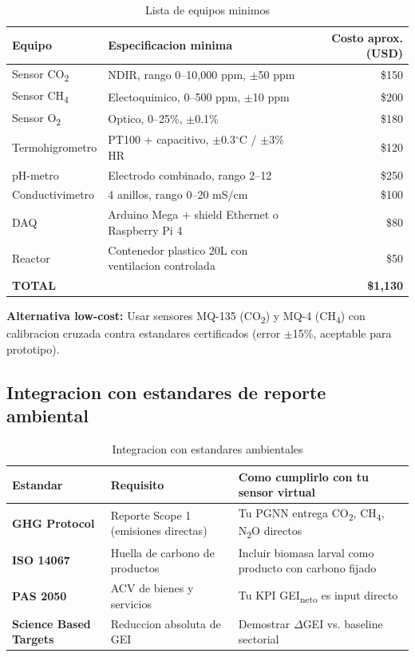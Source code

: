 \documentclass[12pt]{article}
\begin{document}
\begin{table}[H]
\centering
\caption{Lista de equipos minimos}
\label{tab:equipos_minimos}
\begin{tabular}{|l|l|r|}
\hline
\textbf{Equipo} & \textbf{Especificacion minima} & \textbf{Costo aprox. (USD)} \\ \hline
Sensor CO\textsubscript{2} & NDIR, rango 0--10,000 ppm, $\pm$50 ppm & \$150 \\ \hline
Sensor CH\textsubscript{4} & Electoquimico, 0--500 ppm, $\pm$10 ppm & \$200 \\ \hline
Sensor O\textsubscript{2} & Optico, 0--25\%, $\pm$0.1\% & \$180 \\ \hline
Termohigrometro & PT100 + capacitivo, $\pm$0.3$^\circ$C / $\pm$3\% HR & \$120 \\ \hline
pH-metro & Electrodo combinado, rango 2--12 & \$250 \\ \hline
Conductivimetro & 4 anillos, rango 0--20 mS/cm & \$100 \\ \hline
DAQ & Arduino Mega + shield Ethernet o Raspberry Pi 4 & \$80 \\ \hline
Reactor & Contenedor plastico 20L con ventilacion controlada & \$50 \\ \hline
\textbf{TOTAL} & & \textbf{\$1,130} \\ \hline
\end{tabular}
\end{table}

\noindent\textbf{Alternativa low-cost:} Usar sensores MQ-135 (CO\textsubscript{2}) y MQ-4 (CH\textsubscript{4}) con calibracion cruzada contra estandares certificados (error $\pm$15\%, aceptable para prototipo).

\subsection{Integracion con estandares de reporte ambiental}

\begin{table}[H]
\centering
\caption{Integracion con estandares ambientales}
\label{tab:estandares_ambientales}
\begin{tabular}{|l|l|l|}
\hline
\textbf{Estandar} & \textbf{Requisito} & \textbf{Como cumplirlo con tu sensor virtual} \\ \hline
\textbf{GHG Protocol} & Reporte Scope 1 (emisiones directas) & Tu PGNN entrega CO\textsubscript{2}, CH\textsubscript{4}, N\textsubscript{2}O directos \\ \hline
\textbf{ISO 14067} & Huella de carbono de productos & Incluir biomasa larval como producto con carbono fijado \\ \hline
\textbf{PAS 2050} & ACV de bienes y servicios & Tu KPI GEI\textsubscript{neto} es input directo \\ \hline
\textbf{Science Based Targets} & Reduccion absoluta de GEI & Demostrar $\Delta$GEI vs. baseline sectorial \\ \hline
\end{tabular}
\end{table}
\end{document}
